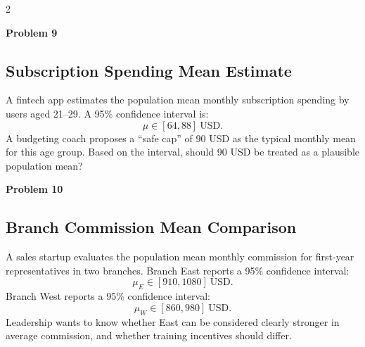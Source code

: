 \documentclass[12pt]{article}
\newcommand{\SubsectionBox}[1]{%
\noindent\colorbox{gray!30}{\parbox{\linewidth}{\textbf{#1}}}\par\vspace{0.35cm}%
}
\begin{document}
\begin{multicols}{2}
\vspace{0.5cm}
\SubsectionBox{Problem 9}
\subsection*{Subscription Spending Mean Estimate}
A fintech app estimates the population mean monthly subscription spending by users aged 21--29.
		A 95\% confidence interval is:
		\[
		\mu \in [64, 88]\ \text{USD}.
		\]
		A budgeting coach proposes a ``safe cap'' of 90 USD as the typical monthly mean for this age group.
		Based on the interval, should 90 USD be treated as a plausible population mean?

\vspace{0.5cm}
\SubsectionBox{Problem 10}
\subsection*{Branch Commission Mean Comparison}
A sales startup evaluates the population mean monthly commission for first-year representatives in two branches.
		Branch East reports a 95\% confidence interval:
		\[
		\mu_E \in [910, 1080]\ \text{USD}.
		\]
		Branch West reports a 95\% confidence interval:
		\[
		\mu_W \in [860, 980]\ \text{USD}.
		\]
		Leadership wants to know whether East can be considered clearly stronger in average commission, and whether training incentives should differ.

\end{multicols}
\end{document}
